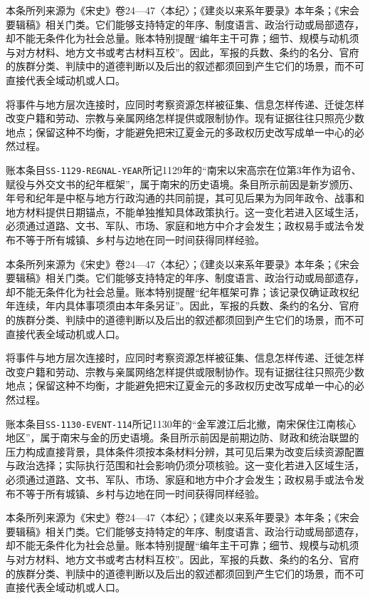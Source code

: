本条所列来源为《宋史》卷24—47〈本纪〉；《建炎以来系年要录》本年条；《宋会要辑稿》相关门类。它们能够支持特定的年序、制度语言、政治行动或局部遗存，却不能无条件化为社会总量。账本特别提醒“编年主干可靠；细节、规模与动机须与对方材料、地方文书或考古材料互校”。因此，军报的兵数、条约的名分、官府的族群分类、判牍中的道德判断以及后出的叙述都须回到产生它们的场景，而不可直接代表全域动机或人口。

将事件与地方层次连接时，应同时考察资源怎样被征集、信息怎样传递、迁徙怎样改变户籍和劳动、宗教与亲属网络怎样提供或限制协作。现有证据往往只照亮少数地点；保留这种不均衡，才能避免把宋辽夏金元的多政权历史改写成单一中心的必然过程。

账本条目\texttt{SS-1129-REGNAL-YEAR}所记1129年的“南宋以宋高宗在位第3年作为诏令、赋役与外交文书的纪年框架”，属于南宋的历史语境。条目所示前因是新岁颁历、年号和纪年是中枢与地方行政沟通的共同前提，其可见后果为为同年政令、战事和地方材料提供日期锚点，不能单独推知具体政策执行。这一变化若进入区域生活，必须通过道路、文书、军队、市场、家庭和地方中介才会发生；政权易手或法令发布不等于所有城镇、乡村与边地在同一时间获得同样经验。

本条所列来源为《宋史》卷24—47〈本纪〉；《建炎以来系年要录》本年条；《宋会要辑稿》相关门类。它们能够支持特定的年序、制度语言、政治行动或局部遗存，却不能无条件化为社会总量。账本特别提醒“纪年框架可靠；该记录仅确证政权纪年连续，年内具体事项须由本年条另证”。因此，军报的兵数、条约的名分、官府的族群分类、判牍中的道德判断以及后出的叙述都须回到产生它们的场景，而不可直接代表全域动机或人口。

将事件与地方层次连接时，应同时考察资源怎样被征集、信息怎样传递、迁徙怎样改变户籍和劳动、宗教与亲属网络怎样提供或限制协作。现有证据往往只照亮少数地点；保留这种不均衡，才能避免把宋辽夏金元的多政权历史改写成单一中心的必然过程。

账本条目\texttt{SS-1130-EVENT-114}所记1130年的“金军渡江后北撤，南宋保住江南核心地区”，属于南宋与金的历史语境。条目所示前因是前期边防、财政和统治联盟的压力构成直接背景，具体条件须按本条材料分辨，其可见后果为改变后续资源配置与政治选择；实际执行范围和社会影响仍须分项核验。这一变化若进入区域生活，必须通过道路、文书、军队、市场、家庭和地方中介才会发生；政权易手或法令发布不等于所有城镇、乡村与边地在同一时间获得同样经验。

本条所列来源为《宋史》卷24—47〈本纪〉；《建炎以来系年要录》本年条；《宋会要辑稿》相关门类。它们能够支持特定的年序、制度语言、政治行动或局部遗存，却不能无条件化为社会总量。账本特别提醒“编年主干可靠；细节、规模与动机须与对方材料、地方文书或考古材料互校”。因此，军报的兵数、条约的名分、官府的族群分类、判牍中的道德判断以及后出的叙述都须回到产生它们的场景，而不可直接代表全域动机或人口。

